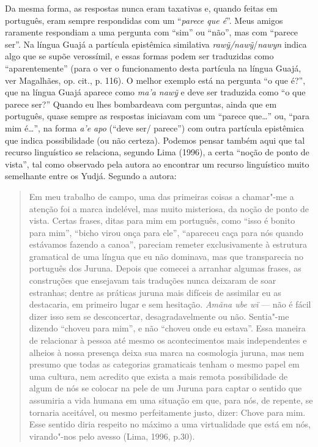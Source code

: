 Da mesma forma, as respostas nunca eram taxativas e, quando feitas em
português, eram sempre respondidas com um ``\emph{parece que é}''. Meus
amigos raramente respondiam a uma pergunta com ``sim'' ou ``não'', mas com
``parece ser''. Na língua Guajá a partícula epistêmica similativa
\emph{rawỹ/nawỹ}/\emph{nawyn} indica algo que se supõe verossímil, e
essas formas podem ser traduzidas como ``aparentemente'' (para o ver o
funcionamento desta partícula na língua Guajá, ver Magalhães, op. cit.,
p. 116). O melhor exemplo está na pergunta ``o que é?'', que na língua
Guajá aparece como \emph{ma'a nawỹ} e deve ser traduzida como ``o que
parece ser?'' Quando eu lhes bombardeava com perguntas, ainda que em
português, quase sempre as respostas iniciavam com um ``parece que\ldots{}''
ou, ``para mim é\ldots{}'', na forma \emph{a'e apo} (``deve ser/ parece'') com
outra partícula epistêmica que indica possibilidade (ou não certeza).
Podemos pensar também aqui que tal recurso linguístico se relaciona,
segundo Lima (1996), a certa ``noção de ponto de vista'', tal como
observado pela autora ao encontrar um recurso linguístico muito
semelhante entre os Yudjá. Segundo a autora:

\begin{quote}
Em meu trabalho de campo, uma das primeiras coisas a chamar"-me a atenção
foi a marca indelével, mas muito misteriosa, da noção de ponto de vista.
Certas frases, ditas para mim em português, como ``isso é bonito para
mim'', ``bicho virou onça para ele'', ``apareceu caça para nós quando
estávamos fazendo a canoa'', pareciam remeter exclusivamente à estrutura
gramatical de uma língua que eu não dominava, mas que transparecia no
português dos Juruna. Depois que comecei a arranhar algumas frases, as
construções que ensejavam tais traduções nunca deixaram de soar
estranhas; dentre as práticas juruna mais difíceis de assimilar eu as
destacaria, em primeiro lugar e sem hesitação. \emph{Amãna ube wï} ---
não é fácil dizer isso sem se desconcertar, desagradavelmente ou não.
Sentia"-me dizendo ``choveu para mim'', e não ``choveu onde eu estava''.
Essa maneira de relacionar à pessoa até mesmo os acontecimentos mais
independentes e alheios à nossa presença deixa sua marca na cosmologia
juruna, mas nem presumo que todas as categorias gramaticais tenham o
mesmo papel em uma cultura, nem acredito que exista a mais remota
possibilidade de algum de nós se colocar na pele de um Juruna para
captar o sentido que assumiria a vida humana em uma situação em que,
para nós, de repente, se tornaria aceitável, ou mesmo perfeitamente
justo, dizer: Chove para mim. Esse sentido diria respeito no máximo a
uma virtualidade que está em nós, virando"-nos pelo avesso (Lima, 1996,
p.30).
\end{quote}

